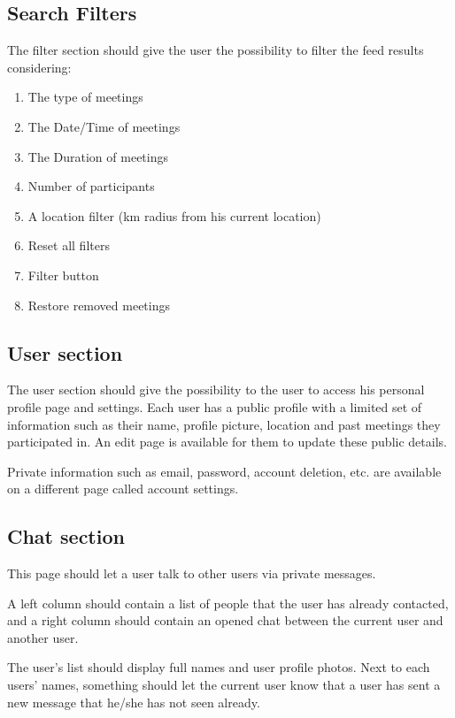\documentclass[conference]{IEEEtran}
\begin{document}
\subsection{Search Filters}

The filter section should give the user the possibility to filter the feed results considering:

\begin{enumerate}
\item The type of meetings
\item The Date/Time of meetings
\item The Duration of meetings
\item Number of participants
\item A location filter (km radius from his current
location)
\item Reset all filters
\item Filter button
\item Restore removed meetings
\end{enumerate}

\subsection{User section}

The user section should give the possibility to the user to
access his personal profile page and settings. Each user has a public profile with a limited set of information such as their name, profile picture, location and past meetings they participated in. An edit page is available for them to update these public details.

Private information such as email, password, account deletion, etc. are available on a different page called account settings.

\subsection{Chat section}

This page should let a user talk to other users via private
messages.

A left column should contain a list of people that the user
has already contacted, and a right column should contain an opened chat between the current user and another user.

The user’s list should display full names and user profile photos. Next to each users' names, something should let the current user know that a user has sent a new message that he/she has not seen already.
\end{document}
